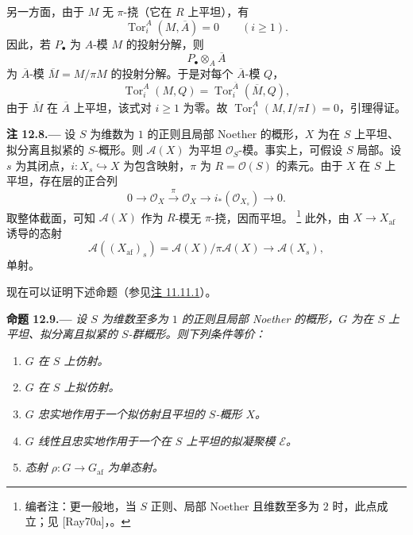 另一方面，由于 \(M\) 无 \(\pi\)-挠\textup{（它在 \(R\) 上平坦）}，有
\[
  \operatorname{Tor}_i^A(M,\overline A)=0
  \qquad(i\geq1).
\]
因此，若 \(P_\bullet\) 为 \(A\)-模 \(M\) 的投射分解，则
\[
  P_\bullet\otimes_A\overline A
\]
为 \(\overline A\)-模 \(\overline M=M/\pi M\) 的投射分解。于是对每个 \(\overline A\)-模 \(Q\)，
\[
  \operatorname{Tor}_i^A(M,Q)
    =\operatorname{Tor}_i^{\overline A}(\overline M,Q),
\]
由于 \(\overline M\) 在 \(\overline A\) 上平坦，该式对 \(i\geq1\) 为零。故 \(\operatorname{Tor}_1^A(M,I/\pi I)=0\)，引理得证。

\medskip
{}\label{rem:sga3-VIB-12.8}%
\noindent\textbf{注 12.8.---}
设 \(S\) 为维数为 \(1\) 的正则且局部 Noether 的概形，\(X\) 为在 \(S\) 上平坦、拟分离且拟紧的 \(S\)-概形。则 \(\mathcal A(X)\) 为平坦 \(\mathcal O_S\)-模。事实上，可假设 \(S\) 局部。设 \(s\) 为其闭点，\(i:X_s\hookrightarrow X\) 为包含映射，\(\pi\) 为 \(R=\mathcal O(S)\) 的素元。由于 \(X\) 在 \(S\) 上平坦，存在层的正合列
\label{form:sga3-VIB-12.8-sheaf-exact-sequence}%
\[
  0\longrightarrow\mathcal O_X
    \xrightarrow{\ \pi\ }\mathcal O_X
    \longrightarrow i_*(\mathcal O_{X_s})
    \longrightarrow0.
\]
取整体截面，可知 \(\mathcal A(X)\) 作为 \(R\)-模无 \(\pi\)-挠，因而平坦。%
\footnote{\label{note:sga3-VIB-138}编者注：更一般地，当 \(S\) 正则、局部 Noether 且维数至多为 \(2\) 时，此点成立；见 \textup{[Ray70a]}，。}
此外，由 \(X\to X_{\mathrm{af}}\) 诱导的态射
\[
  \mathcal A((X_{\mathrm{af}})_s)
    =\mathcal A(X)/\pi\mathcal A(X)
    \longrightarrow\mathcal A(X_s),
\]
单射。

现在可以证明下述命题\textup{（参见\hyperref[rem:sga3-VIB-11.11.1]{注 11.11.1}）}。

\medskip
{}\label{prop:sga3-VIB-12.9}%
\noindent\textbf{命题 12.9.---}
\emph{设 \(S\) 为维数至多为 \(1\) 的正则且局部 Noether 的概形，\(G\) 为在 \(S\) 上平坦、拟分离且拟紧的 \(S\)-群概形。则下列条件等价：}
\begin{enumerate}
\item[\textup{(i)}]\label{prop:sga3-VIB-12.9-i}%
  \emph{\(G\) 在 \(S\) 上仿射。}

\item[\textup{(ii)}]\label{prop:sga3-VIB-12.9-ii}%
  \emph{\(G\) 在 \(S\) 上拟仿射。}

\item[\textup{(iii)}]\label{prop:sga3-VIB-12.9-iii}%
  \emph{\(G\) 忠实地作用于一个拟仿射且平坦的 \(S\)-概形 \(X\)。}

\item[\textup{(iv)}]\label{prop:sga3-VIB-12.9-iv}%
  \emph{\(G\) 线性且忠实地作用于一个在 \(S\) 上平坦的拟凝聚模 \(\mathcal E\)。}

\item[\textup{(v)}]\label{prop:sga3-VIB-12.9-v}%
  \emph{态射 \(\rho:G\to G_{\mathrm{af}}\) 为单态射。}
\end{enumerate}

